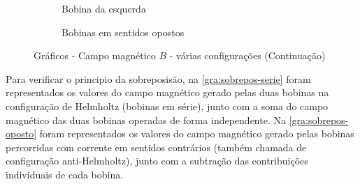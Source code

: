 \begin{figure}[!ht]
	\ContinuedFloat
	\centering
	\begin{subfigure}[b]{0.49\textwidth}
		\centering
		\caption{Bobina da esquerda}
		\label{1dfse}
	\end{subfigure}
	\hfill
	\begin{subfigure}[b]{0.49\textwidth}
		\centering
		\caption{Bobinas em sentidos opostos}
		\label{dfs}
	\end{subfigure}
	\caption{Gráficos - Campo magnético ${B}$ - várias configurações (Continuação)}
	\label{fig:comparacao}
\end{figure}


Para verificar o principio da sobreposisão, na \cref{gra:sobrepos-serie} foram representados os valores do campo magnético gerado pelas duas bobinas na configuração de Helmholtz (bobinas em série), junto com a soma do campo magnético das duas bobinas operadas de forma independente. Na \cref{gra:sobrepos-oposto} foram representados os valores do campo magnético gerado pelas bobinas percorridas com corrente em sentidos contrários (também chamada de configuração anti-Helmholtz), junto com a subtração das contribuições individuais de cada bobina.

